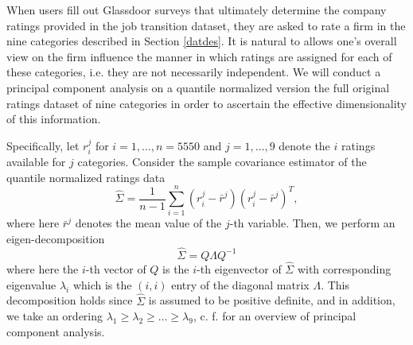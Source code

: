 \documentclass[10pt]{article}
\begin{document}
When users fill out Glassdoor surveys that ultimately determine the 
company ratings provided in the job transition dataset, they are asked to 
rate a firm in the nine categories described in Section \ref{datdes}.
It is natural to allows one's overall view on the firm influence 
the manner in which ratings are assigned for each of these
categories, i.e. they are not necessarily independent.  We will 
conduct a principal component analysis on a quantile normalized 
version the full original ratings dataset of nine categories in 
order to ascertain the effective dimensionality of this information. 

Specifically, let $r_i^j$ for $i=1,\ldots,n=5550$ and $j=1,\ldots,9$ denote 
the $i$ ratings available for $j$ categories. Consider the sample covariance 
estimator of the quantile normalized ratings data
%
\begin{equation}
    \hat{\Sigma} = \frac{1}{n-1}\sum_{i=1}^n (r_i^j-\bar{r}^j)(r_i^j-\bar{r}^j)^T, 
\end{equation}
%
where here $\bar{r}^j$ denotes the mean value of the $j$-th variable.  Then, we 
perform an eigen-decomposition 
%
\begin{equation}
    \hat{\Sigma} = Q\Lambda Q^{-1}
\end{equation}
%
where here the $i$-th vector of $Q$ is the $i$-th eigenvector of $\hat{\Sigma}$ with 
corresponding eigenvalue $\lambda_i$ which is the $(i,i)$ entry of the diagonal matrix 
$\Lambda$.  This decomposition holds since $\hat{\Sigma}$ is assumed to be positive 
definite, and in addition, we take an ordering $\lambda_1\geq\lambda_2\geq \ldots\geq \lambda_9$,
c. f. \cite{Shlens05atutorial} for an overview of principal component analysis.
\end{document}
